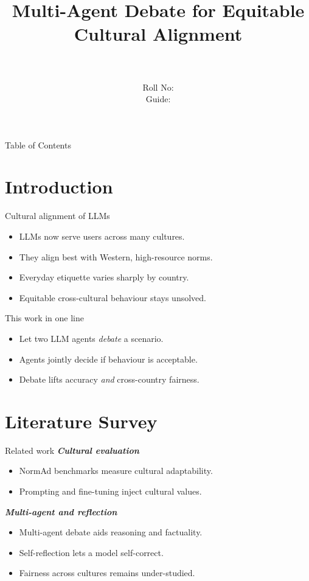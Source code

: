 \documentclass{beamer}
\title[\seminarShortTitle]{Multi-Agent Debate for Equitable Cultural Alignment}
\author[\seminarName\ (\seminarShortCollege)]{\seminarName \\ \seminarRoll \\ Roll No: \seminarClassRoll \\ Guide: \seminarGuide}
\institute[\seminarShortCollege]{\seminarDept \\ \seminarCollege}
\date{\seminarDate}
\begin{document}
\begin{frame}\titlepage\end{frame}
\begin{frame}{Table of Contents}\tableofcontents\end{frame}
\section{Introduction}
\begin{frame}{Cultural alignment of LLMs}
\begin{itemize}
\item LLMs now serve users across many cultures.
\item They align best with Western, high-resource norms.
\item Everyday etiquette varies sharply by country.
\item Equitable cross-cultural behaviour stays unsolved.
\end{itemize}
\end{frame}

\begin{frame}{This work in one line}
\begin{itemize}
\item Let two LLM agents \textit{debate} a scenario.
\item Agents jointly decide if behaviour is acceptable.
\item Debate lifts accuracy \emph{and} cross-country fairness.
\end{itemize}
\end{frame}

\section{Literature Survey}
\begin{frame}{Related work}
\textbf{\textit{Cultural evaluation}}
\begin{itemize}
\item NormAd benchmarks measure cultural adaptability.
\item Prompting and fine-tuning inject cultural values.
\end{itemize}
\textbf{\textit{Multi-agent and reflection}}
\begin{itemize}
\item Multi-agent debate aids reasoning and factuality.
\item Self-reflection lets a model self-correct.
\item Fairness across cultures remains under-studied.
\end{itemize}
\end{frame}
\end{document}
